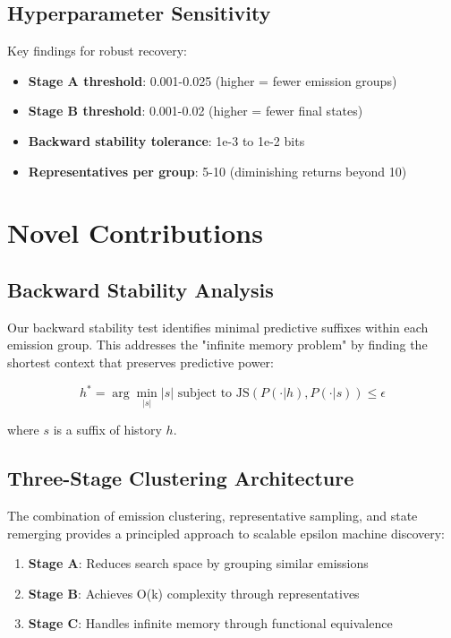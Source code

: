 \documentclass[12pt]{article}
\begin{document}
\subsection{Hyperparameter Sensitivity}

Key findings for robust recovery:
\begin{itemize}
    \item \textbf{Stage A threshold}: 0.001-0.025 (higher = fewer emission groups)
    \item \textbf{Stage B threshold}: 0.001-0.02 (higher = fewer final states)
    \item \textbf{Backward stability tolerance}: 1e-3 to 1e-2 bits
    \item \textbf{Representatives per group}: 5-10 (diminishing returns beyond 10)
\end{itemize}

\section{Novel Contributions}

\subsection{Backward Stability Analysis}

Our backward stability test identifies minimal predictive suffixes within each emission group. This addresses the "infinite memory problem" by finding the shortest context that preserves predictive power:

$$h^* = \arg\min_{|s|} |s| \text{ subject to } \text{JS}(P(\cdot|h), P(\cdot|s)) \leq \epsilon$$

where $s$ is a suffix of history $h$.

\subsection{Three-Stage Clustering Architecture}

The combination of emission clustering, representative sampling, and state remerging provides a principled approach to scalable epsilon machine discovery:

\begin{enumerate}
    \item \textbf{Stage A}: Reduces search space by grouping similar emissions
    \item \textbf{Stage B}: Achieves O(k) complexity through representatives
    \item \textbf{Stage C}: Handles infinite memory through functional equivalence
\end{enumerate}
\end{document}
